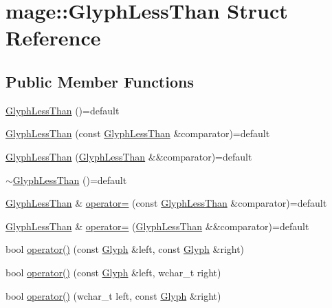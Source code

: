 \hypertarget{structmage_1_1_glyph_less_than}{}\section{mage\+:\+:Glyph\+Less\+Than Struct Reference}
\label{structmage_1_1_glyph_less_than}
\subsection*{Public Member Functions}
\begin{DoxyCompactItemize}
\item 
\hyperlink{structmage_1_1_glyph_less_than_a2ad76294131749c19d83b6f92c74f1dc}{Glyph\+Less\+Than} ()=default
\item 
\hyperlink{structmage_1_1_glyph_less_than_a27fc34d9db41ebba7a7b40864837e7e7}{Glyph\+Less\+Than} (const \hyperlink{structmage_1_1_glyph_less_than}{Glyph\+Less\+Than} \&comparator)=default
\item 
\hyperlink{structmage_1_1_glyph_less_than_ae41c3b9b7ecf202b5518f911342e170c}{Glyph\+Less\+Than} (\hyperlink{structmage_1_1_glyph_less_than}{Glyph\+Less\+Than} \&\&comparator)=default
\item 
\hyperlink{structmage_1_1_glyph_less_than_ace50804a419a31b0413566b5aba2eeac}{$\sim$\+Glyph\+Less\+Than} ()=default
\item 
\hyperlink{structmage_1_1_glyph_less_than}{Glyph\+Less\+Than} \& \hyperlink{structmage_1_1_glyph_less_than_aa3de6a126c3a70ad452a17b37709eca6}{operator=} (const \hyperlink{structmage_1_1_glyph_less_than}{Glyph\+Less\+Than} \&comparator)=default
\item 
\hyperlink{structmage_1_1_glyph_less_than}{Glyph\+Less\+Than} \& \hyperlink{structmage_1_1_glyph_less_than_aeee354f70d70e708e7478066c38166b2}{operator=} (\hyperlink{structmage_1_1_glyph_less_than}{Glyph\+Less\+Than} \&\&comparator)=default
\item 
bool \hyperlink{structmage_1_1_glyph_less_than_a5ba9326b1293585e6257cf1d5697a1ba}{operator()} (const \hyperlink{structmage_1_1_glyph}{Glyph} \&left, const \hyperlink{structmage_1_1_glyph}{Glyph} \&right)
\item 
bool \hyperlink{structmage_1_1_glyph_less_than_a263e9b07d9a3d84173739971abc5e217}{operator()} (const \hyperlink{structmage_1_1_glyph}{Glyph} \&left, wchar\+\_\+t right)
\item 
bool \hyperlink{structmage_1_1_glyph_less_than_a1ab127f38f1043b2361dcf73c3510dfd}{operator()} (wchar\+\_\+t left, const \hyperlink{structmage_1_1_glyph}{Glyph} \&right)
\end{DoxyCompactItemize}


